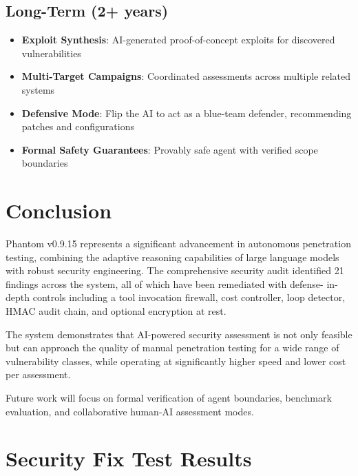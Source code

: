 \documentclass[12pt,a4paper]{article}
\begin{document}
\subsection{Long-Term (2+ years)}
\begin{itemize}[nosep]
    \item \textbf{Exploit Synthesis}: AI-generated proof-of-concept exploits
          for discovered vulnerabilities
    \item \textbf{Multi-Target Campaigns}: Coordinated assessments across
          multiple related systems
    \item \textbf{Defensive Mode}: Flip the AI to act as a blue-team
          defender, recommending patches and configurations
    \item \textbf{Formal Safety Guarantees}: Provably safe agent with
          verified scope boundaries
\end{itemize}

\section{Conclusion}

Phantom v0.9.15 represents a significant advancement in autonomous penetration
testing, combining the adaptive reasoning capabilities of large language models
with robust security engineering. The comprehensive security audit identified
21 findings across the system, all of which have been remediated with defense-
in-depth controls including a tool invocation firewall, cost controller, loop
detector, HMAC audit chain, and optional encryption at rest.

The system demonstrates that AI-powered security assessment is not only feasible
but can approach the quality of manual penetration testing for a wide range of
vulnerability classes, while operating at significantly higher speed and lower
cost per assessment.

Future work will focus on formal verification of agent boundaries, benchmark
evaluation, and collaborative human-AI assessment modes.

\newpage
\appendix
\section{Security Fix Test Results}
\end{document}
